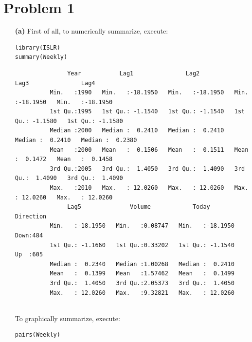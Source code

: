 \documentclass[twoside,11pt]{homework}
\begin{document}
\maketitle

\section*{Problem 1}

	\begin{enumerate}
		
		\item[\textbf{(a)}] First of all, to numerically summarize, execute:
		
		\begin{lstlisting}
library(ISLR)
summary(Weekly)
		\end{lstlisting}
		
		\begin{verbatim}
		       Year           Lag1               Lag2               Lag3               Lag4         
		  Min.   :1990   Min.   :-18.1950   Min.   :-18.1950   Min.   :-18.1950   Min.   :-18.1950  
		  1st Qu.:1995   1st Qu.: -1.1540   1st Qu.: -1.1540   1st Qu.: -1.1580   1st Qu.: -1.1580  
		  Median :2000   Median :  0.2410   Median :  0.2410   Median :  0.2410   Median :  0.2380  
		  Mean   :2000   Mean   :  0.1506   Mean   :  0.1511   Mean   :  0.1472   Mean   :  0.1458  
		  3rd Qu.:2005   3rd Qu.:  1.4050   3rd Qu.:  1.4090   3rd Qu.:  1.4090   3rd Qu.:  1.4090  
		  Max.   :2010   Max.   : 12.0260   Max.   : 12.0260   Max.   : 12.0260   Max.   : 12.0260  
		       Lag5              Volume            Today          Direction 
		  Min.   :-18.1950   Min.   :0.08747   Min.   :-18.1950   Down:484  
		  1st Qu.: -1.1660   1st Qu.:0.33202   1st Qu.: -1.1540   Up  :605  
		  Median :  0.2340   Median :1.00268   Median :  0.2410             
		  Mean   :  0.1399   Mean   :1.57462   Mean   :  0.1499             
		  3rd Qu.:  1.4050   3rd Qu.:2.05373   3rd Qu.:  1.4050             
		  Max.   : 12.0260   Max.   :9.32821   Max.   : 12.0260 
		
		\end{verbatim}
		
		To graphically summarize, execute:
		
		\begin{lstlisting}
pairs(Weekly)
		\end{lstlisting}
		

\end{enumerate}
\end{document}
